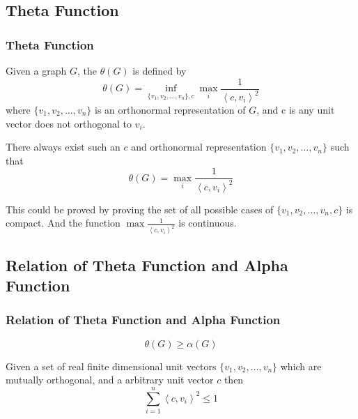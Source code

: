 \subsection{Theta Function}

      \begin{frame}
            \frametitle{Theta Function}
            Given a graph $ G $, the $ \theta(G) $ is defined by
            \begin{equation}
                  \theta(G) = \inf_{\{v_1, v_2, \dots, v_n\},c} \max_{i} \frac{1}{\left<c,v_{i}\right>^2}
            \end{equation}
            where $ \{v_1, v_2, \dots, v_n\} $ is an orthonormal representation of $ G $, and c is any unit vector does not orthogonal to $ v_i $.

            \pause

            \begin{lemma}
                  There always exist such an $c$ and orthonormal representation $ \{v_1, v_2, \dots, v_n\} $ such that
                  \begin{equation}
                        \theta(G) = \max_{i} \frac{1}{\left<c,v_{i}\right>^2}
                  \end{equation}
            \end{lemma}

            This could be proved by proving the set of all possible cases of $ \{v_1, v_2, \dots, v_n,c \} $ is compact. And the function $ \max \frac{1}{\left<c,v_{i}\right>^2} $ is continuous.
      \end{frame}

\subsection*{Relation of Theta Function and Alpha Function}

      \begin{frame}
            \frametitle{Relation of Theta Function and Alpha Function}

            \begin{lemma}
                  \begin{equation}
                        \theta(G) \geq \alpha(G)
                  \end{equation}
            \end{lemma}

            \begin{lemma}
                  Given a set of real finite dimensional unit vectors $ \{v_1, v_2, \dots, v_n\} $ which are mutually orthogonal, and a arbitrary unit vector $c$ then
                  \begin{equation}
                        \sum_{i=1}^{n}\left<c,v_{i}\right>^2 \le 1
                  \end{equation}
            \end{lemma}
      \end{frame}

